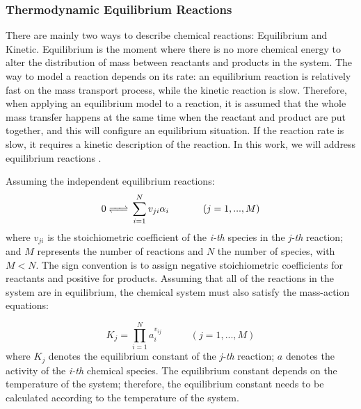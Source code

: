 \subsubsection{Thermodynamic Equilibrium Reactions}
There are mainly two ways to describe chemical reactions: Equilibrium and Kinetic. Equilibrium is the moment where there is no more chemical energy to alter the distribution of mass between reactants and products in the system. The way to model a reaction depends on its rate: an equilibrium reaction is relatively fast on the mass transport process, while the kinetic reaction is slow. Therefore, when applying an equilibrium model to a reaction, it is assumed that the whole mass transfer happens at the same time when the reactant and product are put together, and this will configure an equilibrium situation. If the reaction rate is slow, it requires a kinetic description of the reaction. In this work, we will address equilibrium reactions \cite{Nordstrom:86}. 

Assuming the independent equilibrium reactions:
\begin{equation}\label{reaction}
0 \ce{<=>} \sum\limits_{i=1}^N  v_{ji} \alpha_i \hspace{35pt}    (j = 1, ... , M)
\end{equation}
where $v_{ji}$ is the stoichiometric coefficient of the \emph{i-th} species in the \emph{j-th} reaction; and $M$ represents the number of reactions and $N$ the number of species, with $M < N$. The sign convention is to assign negative stoichiometric coefficients for reactants and positive for products. Assuming that all of the reactions in the system are in equilibrium, the chemical system must also satisfy the mass-action equations:

\begin{equation}\label{eq:massaction}
K_j =  \prod\limits_{i=1}^N  a_i^{v_{ij}} \hspace{35pt}    (j = 1, ... , M)
\end{equation}
where $K_j$ denotes the equilibrium constant of the \emph{j-th} reaction; $a$ denotes the activity of the \emph{i-th} chemical species. The equilibrium constant depends on the temperature of the system; therefore, the equilibrium constant needs to be calculated according to the temperature of the system. 

